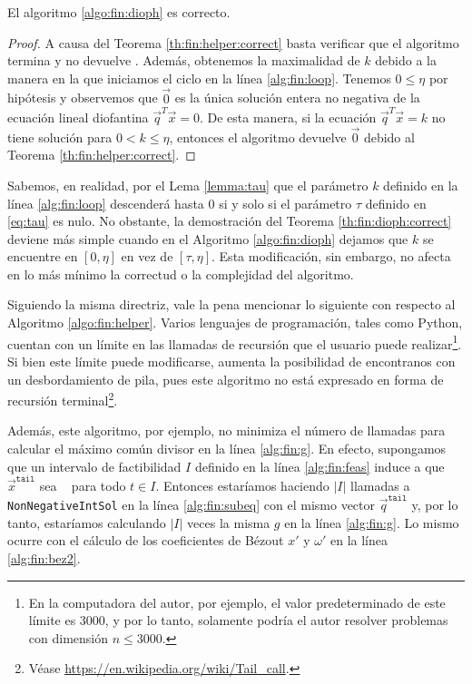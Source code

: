 \begin{theorem}
	\label{th:fin:dioph:correct}
	El algoritmo \ref{algo:fin:dioph} es correcto.
\end{theorem}
\begin{proof}
	A causa del Teorema \ref{th:fin:helper:correct} basta verificar que el algoritmo termina y no
	devuelve \NIL. Además, obtenemos la maximalidad de $k$ debido a la manera en la que iniciamos el
	ciclo en la línea \ref{alg:fin:loop}. Tenemos $0 \leq \eta$ por hipótesis y observemos que
	$\vec{0}$ es la única solución entera no negativa de la ecuación lineal diofantina
	$\vec{q}^T\vec{x} = 0$. De esta manera, si la ecuación $\vec{q}^T\vec{x} = k$ no tiene solución
	para $0 < k \leq \eta$, entonces el algoritmo devuelve $\vec{0}$ debido al Teorema
	\ref{th:fin:helper:correct}.
\end{proof}

Sabemos, en realidad, por el Lema \ref{lemma:tau} que el parámetro $k$ definido en la línea
\eqref{alg:fin:loop} descenderá hasta 0 si y solo si el parámetro $\tau$ definido en \eqref{eq:tau}
es nulo. No obstante, la demostración del Teorema \ref{th:fin:dioph:correct} deviene más simple
cuando en el Algoritmo \ref{algo:fin:dioph} dejamos que $k$ se encuentre en $[0, \eta]$ en vez de
$[\tau, \eta]$. Esta modificación, sin embargo, no afecta en lo más mínimo la correctud o la
complejidad del algoritmo.

Siguiendo la misma directriz, vale la pena mencionar lo siguiente con respecto al Algoritmo
\ref{algo:fin:helper}. Varios lenguajes de programación, tales como Python, cuentan con un límite en
las llamadas de recursión que el usuario puede realizar\footnote{
	En la computadora del autor, por ejemplo, el valor predeterminado de este límite es 3000, y por
	lo tanto, solamente podría el autor resolver problemas con dimensión $n \leq 3000$.
}. Si bien este límite puede modificarse, aumenta la posibilidad de encontranos con un
desbordamiento de pila, pues este algoritmo no está expresado en forma de recursión
terminal\footnote{
	Véase \url{https://en.wikipedia.org/wiki/Tail_call}.
}.

Además, este algoritmo, por ejemplo, no minimiza el número de llamadas para calcular el máximo común
divisor en la línea \ref{alg:fin:g}. En efecto, supongamos que un intervalo de factibilidad $I$
definido en la línea \ref{alg:fin:feas} induce a que $\vec{x}^{\texttt{tail}}$ sea \NIL~ para todo
$t \in I$. Entonces estaríamos haciendo $|I|$ llamadas a \texttt{NonNegativeIntSol} en la línea
\eqref{alg:fin:subeq} con el mismo vector $\vec{q}^{\texttt{tail}}$ y, por lo tanto, estaríamos
calculando $|I|$ veces la misma $g$ en la línea \ref{alg:fin:g}. Lo mismo ocurre con el cálculo de
los coeficientes de Bézout $x'$ y $\omega'$ en la línea \ref{alg:fin:bez2}.

